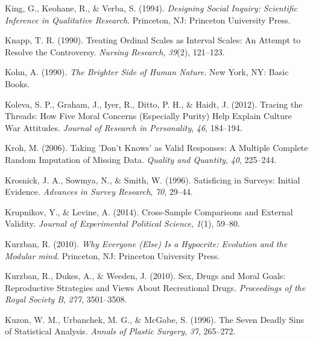 \documentclass[12pt,econ]{sources/authesis}
\newenvironment{CSLReferences}%
  {}%
  {\par}
\begin{document}
\begin{CSLReferences}{1}{0}
\leavevmode{}%
King, G., Keohane, R., \& Verba, S. (1994). \emph{Designing {Social} {Inquiry}: {Scientific} {Inference} in {Qualitative} {Research}}. Princeton, NJ: Princeton University Press.

\leavevmode{}%
Knapp, T. R. (1990). {Treating Ordinal Scales as Interval Scales: An Attempt to Resolve the Controversy}. \emph{Nursing Research}, \emph{39}(2), 121--123.

\leavevmode{}%
Kohn, A. (1990). \emph{The {Brighter} {Side} of {Human} {Nature}}. New York, NY: Basic Books.

\leavevmode{}%
Koleva, S. P., Graham, J., Iyer, R., Ditto, P. H., \& Haidt, J. (2012). {Tracing the Threads: How Five Moral Concerns (Especially Purity) Help Explain Culture War Attitudes}. \emph{Journal of Research in Personality}, \emph{46}, 184--194.

\leavevmode{}%
Kroh, M. (2006). {Taking 'Don't Knows' as Valid Responses: A Multiple Complete Random Imputation of Missing Data}. \emph{Quality and Quantity}, \emph{40}, 225--244.

\leavevmode{}%
Krosnick, J. A., Sowmya, N., \& Smith, W. (1996). {Satisficing in Surveys: Initial Evidence}. \emph{Advances in Survey Research}, \emph{70}, 29--44.

\leavevmode{}%
Krupnikov, Y., \& Levine, A. (2014). {Cross-Sample Comparisons and External Validity}. \emph{Journal of Experimental Political Science}, \emph{1}(1), 59--80.

\leavevmode{}%
Kurzban, R. (2010). \emph{{Why Everyone (Else) Is a Hypocrite: Evolution and the Modular mind}}. Princeton, NJ: Princeton University Press.

\leavevmode{}%
Kurzban, R., Dukes, A., \& Weeden, J. (2010). {Sex, Drugs and Moral Goals: Reproductive Strategies and Views About Recreational Drugs}. \emph{Proceedings of the Royal Society B}, \emph{277}, 3501--3508.

\leavevmode{}%
Kuzon, W. M., Urbanchek, M. G., \& McGabe, S. (1996). {The Seven Deadly Sins of Statistical Analysis}. \emph{Annals of Plastic Surgery}, \emph{37}, 265--272.


\end{CSLReferences}
\end{document}
